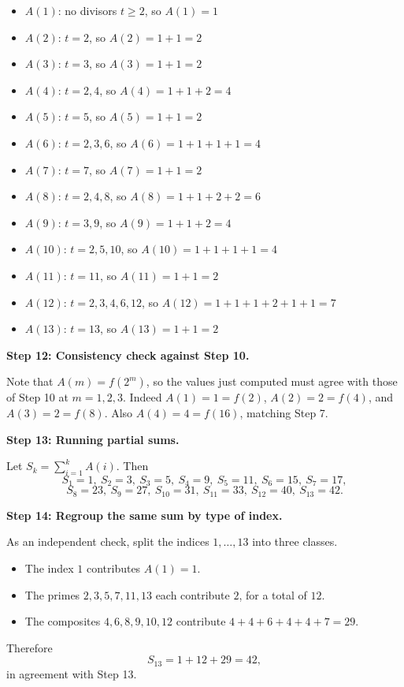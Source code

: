 \begin{enumerate}
 
            \begin{itemize}
        \item $A(1)$: no divisors $t\ge2$, so $A(1)=1$
        \item $A(2)$: $t=2$, so $A(2)=1+1=2$
        \item $A(3)$: $t=3$, so $A(3)=1+1=2$
        \item $A(4)$: $t=2,4$, so $A(4)=1+1+2=4$
        \item $A(5)$: $t=5$, so $A(5)=1+1=2$
        \item $A(6)$: $t=2,3,6$, so $A(6)=1+1+1+1=4$
        \item $A(7)$: $t=7$, so $A(7)=1+1=2$
        \item $A(8)$: $t=2,4,8$, so $A(8)=1+1+2+2=6$
        \item $A(9)$: $t=3,9$, so $A(9)=1+1+2=4$
        \item $A(10)$: $t=2,5,10$, so $A(10)=1+1+1+1=4$
        \item $A(11)$: $t=11$, so $A(11)=1+1=2$
        \item $A(12)$: $t=2,3,4,6,12$, so $A(12)=1+1+1+2+1+1=7$
        \item $A(13)$: $t=13$, so $A(13)=1+1=2$
            \end{itemize}
            \textbf{Step 12: Consistency check against Step 10.}

 Note that $A(m)=f(2^m)$, so the values just computed must agree with those of Step 10 at $m=1,2,3$. Indeed $A(1)=1=f(2)$, $A(2)=2=f(4)$, and $A(3)=2=f(8)$. Also $A(4)=4=f(16)$, matching Step 7.

 \textbf{Step 13: Running partial sums.}

 Let $S_k=\sum_{i=1}^{k}A(i)$. Then
 \[S_1=1,\ S_2=3,\ S_3=5,\ S_4=9,\ S_5=11,\ S_6=15,\ S_7=17,\]
 \[S_8=23,\ S_9=27,\ S_{10}=31,\ S_{11}=33,\ S_{12}=40,\ S_{13}=42.\]

 \textbf{Step 14: Regroup the same sum by type of index.}

 As an independent check, split the indices $1,\dots,13$ into three classes.

 
            \begin{itemize}
        \item The index $1$ contributes $A(1)=1$.
        \item The primes $2,3,5,7,11,13$ each contribute $2$, for a total of $12$.
        \item The composites $4,6,8,9,10,12$ contribute $4+4+6+4+4+7=29$.
            \end{itemize}
            Therefore
 \[S_{13}=1+12+29=42,\]in agreement with Step 13.


\end{enumerate}
